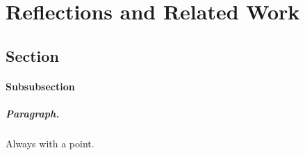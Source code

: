 \chapter{Reflections and Related Work}
\section{Section}
%
\subsubsection{Subsubsection}

\paragraph{Paragraph.} Always with a point.

